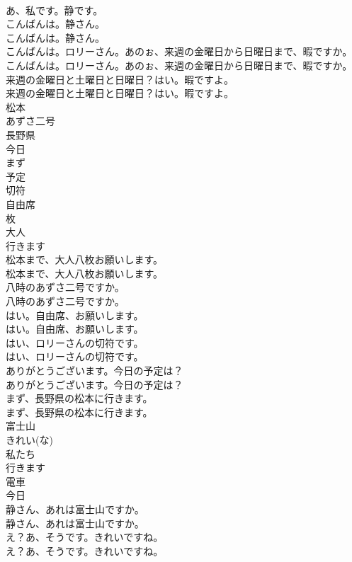 \documentclass[8pt]{extreport}
\begin{document}
\begin{CJK}{UTF8}{min}
\\	あ、私です。静です。 
\\	こんばんは。静さん。	
\\	こんばんは。静さん。 
\\	こんばんは。ロリーさん。あのぉ、来週の金曜日から日曜日まで、暇ですか。	
\\	こんばんは。ロリーさん。あのぉ、来週の金曜日から日曜日まで、暇ですか。 
\\	来週の金曜日と土曜日と日曜日？はい。暇ですよ。	
\\	来週の金曜日と土曜日と日曜日？はい。暇ですよ。 
\\	松本
\\	あずさ二号
\\	長野県
\\	今日
\\	まず
\\	予定
\\	切符
\\	自由席
\\	枚
\\	大人
\\	行きます
\\	松本まで、大人八枚お願いします。	
\\	松本まで、大人八枚お願いします。 
\\	八時のあずさ二号ですか。	
\\	八時のあずさ二号ですか。 
\\	はい。自由席、お願いします。	
\\	はい。自由席、お願いします。 
\\	はい、ロリーさんの切符です。	
\\	はい、ロリーさんの切符です。 
\\	ありがとうございます。今日の予定は？	
\\	ありがとうございます。今日の予定は？ 
\\	まず、長野県の松本に行きます。	
\\	まず、長野県の松本に行きます。 
\\	富士山
\\	きれい(な)
\\	私たち
\\	行きます
\\	電車
\\	今日
\\	静さん、あれは富士山ですか。	
\\	静さん、あれは富士山ですか。 
\\	え？あ、そうです。きれいですね。	
\\	え？あ、そうです。きれいですね。 

\end{CJK}
\end{document}
